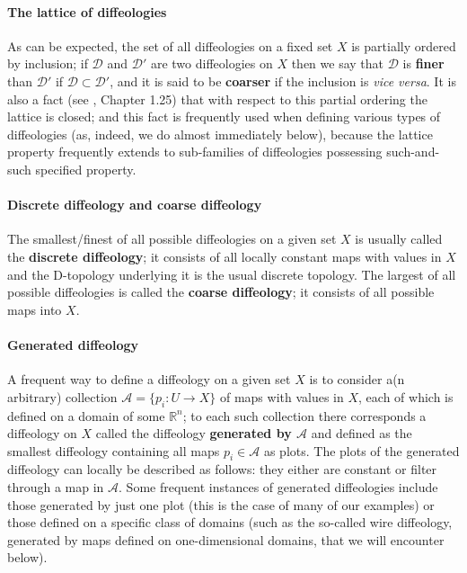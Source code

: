 \documentclass{article}
\newcommand\matR{{\mathbb{R}}}
\newcommand\calD{{\mathcal D}}
\begin{document}
\paragraph{The lattice of diffeologies} As can be expected, the set of all diffeologies on a fixed set $X$ is partially ordered by inclusion; if $\calD$ and $\calD'$ are two diffeologies on $X$ then we say that 
$\calD$ is \textbf{finer} than $\calD'$ if $\calD\subset\calD'$, and it is said to be \textbf{coarser} if the inclusion is \emph{vice versa}. It is also a fact (see \cite{iglesiasBook}, Chapter 1.25) that with respect to 
this partial ordering the lattice is closed; and this fact is frequently used when defining various types of diffeologies (as, indeed, we do almost immediately below), because the lattice property frequently 
extends to sub-families of diffeologies possessing such-and-such specified property.

\paragraph{Discrete diffeology and coarse diffeology} The smallest/finest of all possible diffeologies on a given set $X$ is usually called the \textbf{discrete diffeology}; it consists of all locally constant maps 
with values in $X$ and the D-topology underlying it is the usual discrete topology. The largest of all possible diffeologies is called the \textbf{coarse diffeology}; it consists of all possible maps into $X$.

\paragraph{Generated diffeology} A frequent way to define a diffeology on a given set $X$ is to consider a(n arbitrary) collection $\mathcal{A}=\{p_i:U\to X\}$ of maps with values in $X$, each of which is 
defined on a domain of some $\matR^n$; to each such collection there corresponds a diffeology on $X$ called the diffeology \textbf{generated by $\mathcal{A}$} and defined as the smallest diffeology 
containing all maps $p_i\in\mathcal{A}$ as plots. The plots of the generated diffeology can locally be described as follows: they either are constant or filter through a map in $\mathcal{A}$. Some frequent 
instances of generated diffeologies include those generated by just one plot (this is the case of many of our examples) or those defined on a specific class of domains (such as the so-called wire diffeology, 
generated by maps defined on one-dimensional domains, that we will encounter below).
\end{document}
